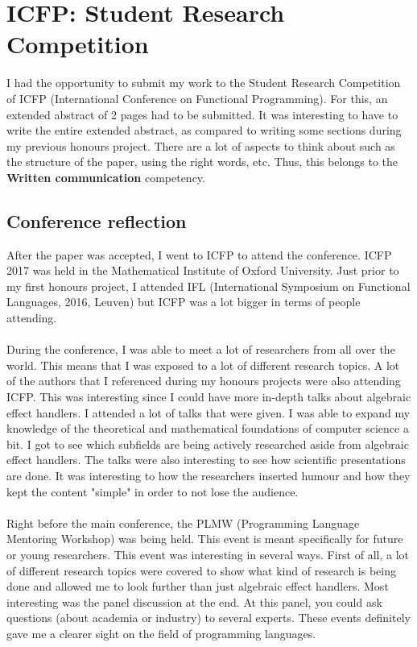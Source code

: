 \documentclass[notitlepage]{article}
\begin{document}
\section{ICFP: Student Research Competition}
I had the opportunity to submit my work to the Student Research Competition of ICFP (International Conference on Functional Programming). For this, an extended abstract of 2 pages had to be submitted. It was interesting to have to write the entire extended abstract, as compared to writing some sections during my previous honours project. There are a lot of aspects to think about such as the structure of the paper, using the right words, etc. Thus, this belongs to the \textbf{Written communication} competency.

\subsection{Conference reflection}
After the paper was accepted, I went to ICFP to attend the conference. ICFP 2017 was held in the Mathematical Institute of Oxford University. Just prior to my first honours project, I attended IFL (International Symposium on Functional Languages, 2016, Leuven) but ICFP was a lot bigger in terms of people attending. \\
\\
During the conference, I was able to meet a lot of researchers from all over the world. This means that I was exposed to a lot of different research topics. A lot of the authors that I referenced during my honours projects were also attending ICFP. This was interesting since I could have more in-depth talks about algebraic effect handlers. I attended a lot of talks that were given. I was able to expand my knowledge of the theoretical and mathematical foundations of computer science a bit. I got to see which subfields are being actively researched aside from algebraic effect handlers. The talks were also interesting to see how scientific presentations are done. It was interesting to how the researchers inserted humour and how they kept the content "simple" in order to not lose the audience. \\
\\
Right before the main conference, the PLMW (Programming Language Mentoring Workshop) was being held. This event is meant specifically for future or young researchers. This event was interesting in several ways. First of all, a lot of different research topics were covered to show what kind of research is being done and allowed me to look further than just algebraic effect handlers. Most interesting was the panel discussion at the end. At this panel, you could ask questions (about academia or industry) to several experts. These events definitely gave me a clearer sight on the field of programming languages. \\
\end{document}
